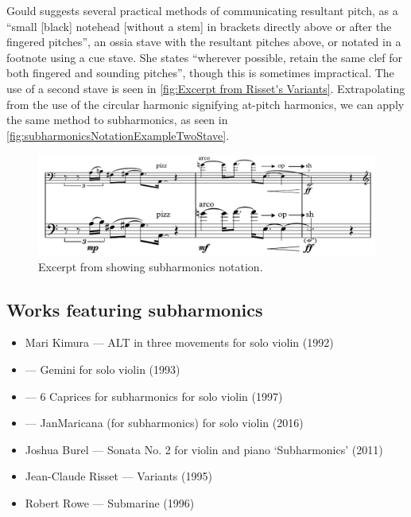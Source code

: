 Gould suggests several practical methods of communicating resultant pitch, as a ``small [black] notehead [without a stem] in brackets directly above or after the fingered pitches'', an ossia stave with the resultant pitches above, or notated in a footnote using a cue stave.\autocite[421]{gouldBars2011}
She states ``wherever possible, retain the same clef for both fingered and sounding pitches'', though this is sometimes impractical.\autocite[422]{gouldBars2011}
The use of a second stave is seen in \autoref{fig:Excerpt from Risset's Variants}.\autocite[It should be noted that Risset's notation omits a fingered pitch, which is not recommended.]{rissetVariants1995}
Extrapolating from the use of the circular harmonic signifying at-pitch harmonics, we can apply the same method to subharmonics, as seen in \autoref{fig:subharmonicsNotationExampleTwoStave}.
\begin{figure}
  \centering
  \includegraphics[width=\linewidth]{./resources/subharmonicsNotationExample.pdf}
  \caption{Excerpt from \bassPiece\space showing subharmonics notation.}\label{fig:subharmonicsNotationExampleTwoStave}
\end{figure}




\subsection{Works featuring subharmonics }\label{sec:subharmonicsLiterature}

\begin{itemize}
    \item Mari Kimura --- ALT in three movements for solo violin (1992)
    \item --- Gemini for solo violin (1993)
    \item --- 6 Caprices for subharmonics for solo violin (1997) 
    \item --- JanMaricana (for subharmonics) for solo violin (2016)
    \item Joshua Burel --- Sonata No. 2 for violin and piano `Subharmonics' (2011)
    \item Jean-Claude Risset --- Variants (1995)
    \item Robert Rowe --- Submarine (1996)
\end{itemize}

